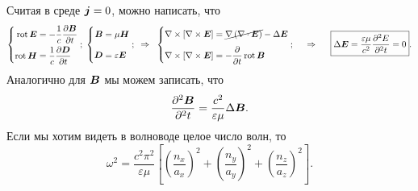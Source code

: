 \noindent
Считая в среде $\mbox{\boldmath $j$} = 0$, можно написать, что
\begin{equation}
    \left\{\begin{aligned}
        \rot \vc{E} &= - \frac{1}{c} \frac{\partial \vc{B}}{\partial t} \\
        \rot \vc{H} &= \frac{1}{c} \frac{\partial \vc{D}}{\partial t}
    \end{aligned}\right.;
    \hspace{0.1cm} 
    \left\{\begin{aligned}
        \vc{B} &= \mu \vc{H} \vphantom{\frac{1}{2}}\\
        \vc{D} &= \varepsilon \vc{E}  \vphantom{\frac{1}{2}}
    \end{aligned}\right.;
    \hspace{0.2cm} \Rightarrow \hspace{0.2cm} 
    \left\{\begin{aligned}
        \nabla \times \left[ \nabla \times \vc{E} \right] &= \cancel{\nabla \left(\nabla \cdot \vc{E}\right)} - \Delta \vc{E} \vphantom{\frac{1}{2}} \\
        \nabla \times \left[ \nabla \times \vc{E} \right] &= -\frac{\partial }{\partial t} \rot \vc{B}
    \end{aligned}\right. ;
    \hspace{0.5cm} \Rightarrow \hspace{0.5cm} 
    \boxed{
        \Delta \vc{E} = \frac{\varepsilon \mu}{c^2} \frac{\partial^2 E}{\partial^2 t}  = 0
    }.
\end{equation}
Аналогично для $\mbox{\boldmath $B$}$ мы можем записать, что
\begin{equation*}
    \frac{\partial^2 \mbox{\boldmath $B$}}{\partial^2 t}  = \frac{c^2}{\varepsilon \mu}  \Delta \mbox{\boldmath $B$}.
\end{equation*}
Если мы хотим видеть в волноводе целое число волн, то
\begin{equation*}
    \omega^2 = \frac{c^2 \pi^2}{\varepsilon \mu} \left[
        \left(\frac{n_x}{a_x}\right)^2 + 
        \left(\frac{n_y}{a_y}\right)^2 + 
        \left(\frac{n_z}{a_z}\right)^2  
    \right].
\end{equation*}